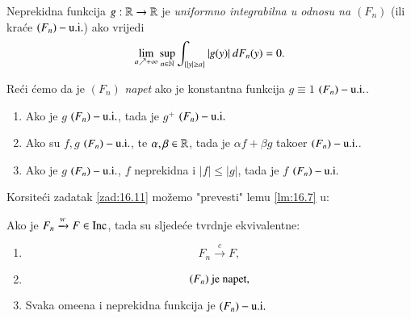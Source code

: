 \begin{defn}    \label{defn:16.10}
    Neprekidna funkcija $g: \mathbb{R} \to \mathbb{R}$ je \emph{uniformno integrabilna u odnosu na $(F_n)$} (ili kra\' ce \emph{$(F_n)-\mathrm{u.i.}$}) ako vrijedi
    \begin{equation*}
        \lim\limits_{a \nearrow +\infty} \sup\limits_{n \in \mathbb{N}} \int_{\{|y| \geq a\}} |g (y)| \: d F_n (y) = 0.
    \end{equation*}
    
    Re\' ci \' cemo da je $(F_n)$ \emph{napet} ako je konstantna funkcija $g \equiv 1$ $(F_n)-\mathrm{u.i.}$.
\end{defn}

\begin{zad} \label{zad:16.11}
    \begin{enumerate}[label=(\roman*)]
        \item \label{zad:16.11.1}
        Ako je $g$ $(F_n)-\mathrm{u.i.}$, tada je $g^+$ $(F_n)-\mathrm{u.i.}$
        \item \label{zad:16.11.2}
        Ako su $f, g$ $(F_n)-\mathrm{u.i.}$, te $\alpha, \beta \in \mathbb{R}$, tada je $\alpha f + \beta g$ tako\dj er $(F_n)-\mathrm{u.i.}$.
        \item \label{zad:16.11.3}
        Ako je $g$ $(F_n)-\mathrm{u.i.}$, $f$ neprekidna i $|f| \leq |g|$, tada je $f$ $(F_n)-\mathrm{u.i.}$ 
    \end{enumerate}
\end{zad}

Korsite\' ci zadatak \ref{zad:16.11} mo\v zemo "prevesti" lemu \ref{lm:16.7} u:

\begin{kor} \label{kor:16.12}
    Ako je $F_n \xrightarrow{w} F \in \mathrm{Inc}$, tada su sljede\' ce tvrdnje ekvivalentne:
    \begin{enumerate}[label=(\roman*)]
        \item \label{kor:16.12.1}
        \begin{equation*}
            F_n \xrightarrow{c} F,
        \end{equation*}
        \item   \label{kor:16.12.2}
        \begin{equation*}
            (F_n) \textnormal{ je napet},
        \end{equation*}
        \item   \label{kor:16.12.3}
        Svaka ome\dj ena i neprekidna funkcija je $(F_n)-\mathrm{u.i.}$
    \end{enumerate}
\end{kor}

